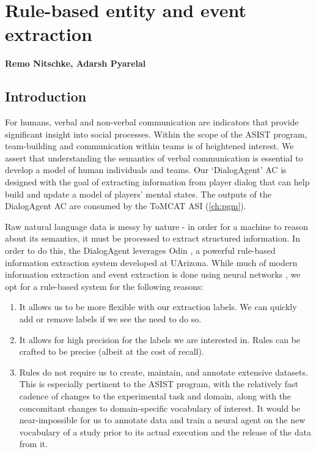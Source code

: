 \chapter{Rule-based entity and event extraction}
\label{ch:rule_based_ie}
\textbf{Remo Nitschke, Adarsh Pyarelal}

\section{Introduction}

For humans, verbal and non-verbal communication are indicators that provide
significant insight into social processes. Within the scope of the ASIST
program, team-building and communication within teams is of heightened
interest. We assert that understanding the semantics of verbal communication is
essential to develop a model of human individuals and teams. Our `DialogAgent'
AC is designed with the goal of extracting information from player dialog that
can help build and update a model of players' mental states. The outputs of the
DialogAgent AC are consumed by the ToMCAT ASI (\autoref{ch:pgm}).

Raw natural language data is messy by nature - in order for a machine to reason
about its semantics, it must be processed to extract structured information.
In order to do this, the DialogAgent leverages Odin
\cite{valenzuela-escarcega-etal-2016-odins}, a powerful rule-based information
extraction system developed at UArizona.  While much of modern information
extraction and event extraction is done using neural networks
\cite{Ahmad2021GATEGA, Du2020EventEB}, we opt for a rule-based system for the
following reasons:

\begin{enumerate}

 \item It allows us to be more flexible with our extraction labels. We can
     quickly add or remove labels if we see the need to do so.

 \item It allows for high precision for the labels we are interested in. Rules
     can be crafted to be precise (albeit at the cost of recall).

 \item Rules do not require us to create, maintain, and annotate extensive
     datasets. This is especially pertinent to the ASIST program, with the
     relatively fast cadence of changes to the experimental task and domain,
     along with the concomitant changes to domain-specific vocabulary of
     interest.  It would be near-impossible for us to annotate data and train a
     neural agent on the new vocabulary of a study prior to its actual
     execution and the release of the data from it. 

\end{enumerate}

